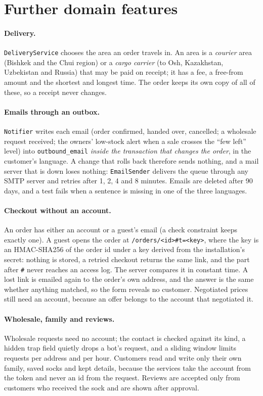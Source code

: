 \section{Further domain features}

\paragraph{Delivery.} \texttt{DeliveryService} chooses the area an order travels in. An area is a \emph{courier}
area (Bishkek and the Chui region) or a \emph{cargo carrier} (to Osh, Kazakhstan, Uzbekistan and Russia) that may be
paid on receipt; it has a fee, a free-from amount and the shortest and longest time. The order keeps its own copy of
all of these, so a receipt never changes.

\paragraph{Emails through an outbox.} \texttt{Notifier} writes each email (order confirmed, handed over, cancelled; a
wholesale request received; the owners' low-stock alert when a sale crosses the ``few left'' level) into
\texttt{outbound\_email} \emph{inside the transaction that changes the order}, in the customer's language. A change that
rolls back therefore sends nothing, and a mail server that is down loses nothing: \texttt{EmailSender} delivers the queue
through any SMTP server and retries after 1, 2, 4 and 8 minutes. Emails are deleted after 90 days, and a test fails when
a sentence is missing in one of the three languages.

\paragraph{Checkout without an account.} An order has either an account or a guest's email (a check constraint keeps
exactly one). A guest opens the order at \texttt{/orders/<id>\#t=<key>}, where the key is an HMAC-SHA256 of the order id
under a key derived from the installation's secret: nothing is stored, a retried checkout returns the same link, and the
part after \texttt{\#} never reaches an access log. The server compares it in constant time. A lost link is emailed
again to the order's own address, and the answer is the same whether anything matched, so the form reveals no
customer. Negotiated prices still need an account, because an offer belongs to the account that negotiated it.

\paragraph{Wholesale, family and reviews.} Wholesale requests need no account; the contact is checked against its kind,
a hidden trap field quietly drops a bot's request, and a sliding window limits requests per address and per hour.
Customers read and write only their own family, saved socks and kept details, because the services take the account
from the token and never an id from the request. Reviews are accepted only from customers who received the sock and are
shown after approval.

